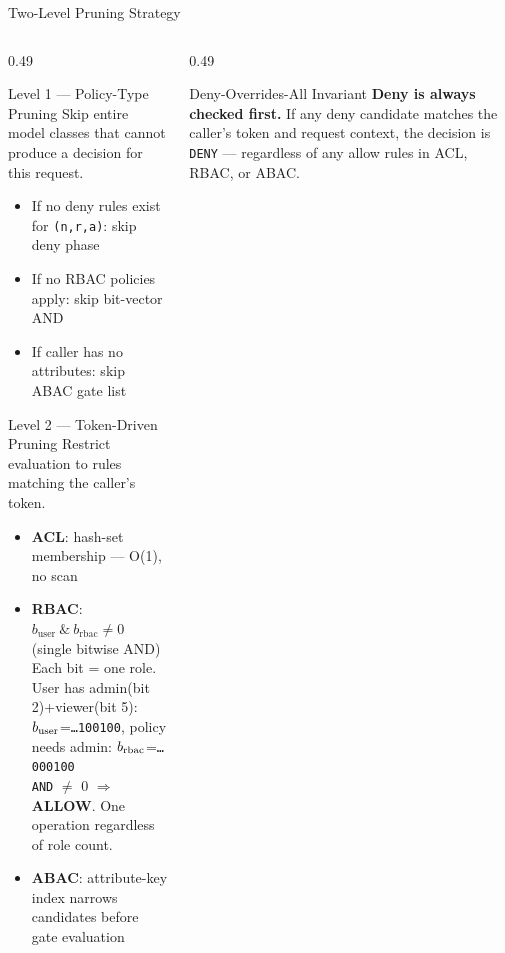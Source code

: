 \documentclass[aspectratio=169,10pt]{beamer}
\newcommand{\tightitems}{%
  \setlength{\topsep}{1pt}%
  \setlength{\itemsep}{2pt}%
  \setlength{\parsep}{0pt}%
  \setlength{\parskip}{0pt}%
}
\begin{document}
\begin{frame}[t]{Two-Level Pruning Strategy}
\vspace{3pt}
\begin{columns}[T,onlytextwidth]
\begin{column}{0.49\textwidth}
\begin{callout}{Level 1 --- Policy-Type Pruning}
Skip entire model classes that cannot produce a decision for this request.
\begin{itemize}\tightitems
\item If no deny rules exist for \texttt{(n,r,a)}: skip deny phase
\item If no RBAC policies apply: skip bit-vector AND
\item If caller has no attributes: skip ABAC gate list
\end{itemize}
\end{callout}
\vspace{3pt}
\begin{callout}{Level 2 --- Token-Driven Pruning}
Restrict evaluation to rules matching the caller's token.
\begin{itemize}\tightitems
\item \textbf{ACL}: hash-set membership --- O(1), no scan
\item \textbf{RBAC}: $b_{\mathrm{user}}\ \&\ b_{\mathrm{rbac}} \neq 0$ (single bitwise AND)\\
      {\tiny\color{uhapGrayD} Each bit = one role. User has admin(bit 2)+viewer(bit 5):\\
      $b_{\rm user}$=\texttt{…100100}, policy needs admin: $b_{\rm rbac}$=\texttt{…000100}\\
      \texttt{AND} $\neq$ 0 $\Rightarrow$ \textcolor{uhapGreen}{\textbf{ALLOW}}. One operation regardless of role count.}
\item \textbf{ABAC}: attribute-key index narrows candidates before gate evaluation
\end{itemize}
\end{callout}
\end{column}
\begin{column}{0.49\textwidth}
\begin{callout}{Deny-Overrides-All Invariant}
\textbf{Deny is always checked first.} If any deny candidate matches the caller's token and request context, the decision is \texttt{DENY} --- regardless of any allow rules in ACL, RBAC, or ABAC.


\end{callout}
\end{column}
\end{columns}
\end{frame}
\end{document}
